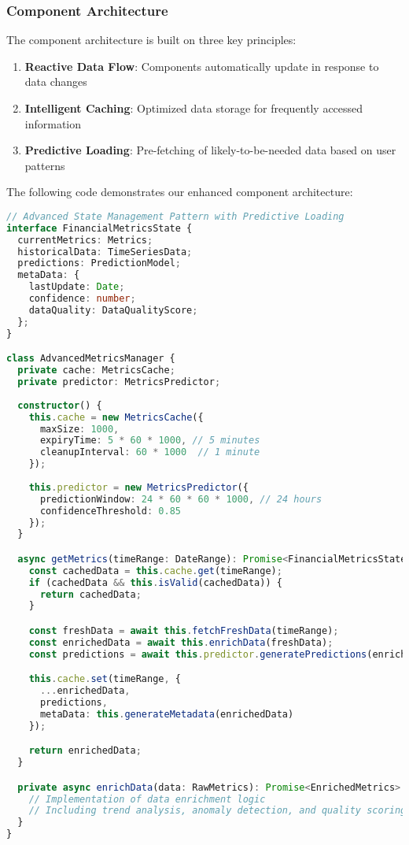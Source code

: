 \documentclass[conference]{IEEEtran}
\begin{document}
\subsubsection{Component Architecture}
The component architecture is built on three key principles:
\begin{enumerate}
\item \textbf{Reactive Data Flow}: Components automatically update in response to data changes
\item \textbf{Intelligent Caching}: Optimized data storage for frequently accessed information
\item \textbf{Predictive Loading}: Pre-fetching of likely-to-be-needed data based on user patterns
\end{enumerate}

The following code demonstrates our enhanced component architecture:

\begin{lstlisting}[language=TypeScript, caption=Enhanced Component Architecture Implementation]
// Advanced State Management Pattern with Predictive Loading
interface FinancialMetricsState {
  currentMetrics: Metrics;
  historicalData: TimeSeriesData;
  predictions: PredictionModel;
  metaData: {
    lastUpdate: Date;
    confidence: number;
    dataQuality: DataQualityScore;
  };
}

class AdvancedMetricsManager {
  private cache: MetricsCache;
  private predictor: MetricsPredictor;
  
  constructor() {
    this.cache = new MetricsCache({
      maxSize: 1000,
      expiryTime: 5 * 60 * 1000, // 5 minutes
      cleanupInterval: 60 * 1000  // 1 minute
    });
    
    this.predictor = new MetricsPredictor({
      predictionWindow: 24 * 60 * 60 * 1000, // 24 hours
      confidenceThreshold: 0.85
    });
  }

  async getMetrics(timeRange: DateRange): Promise<FinancialMetricsState> {
    const cachedData = this.cache.get(timeRange);
    if (cachedData && this.isValid(cachedData)) {
      return cachedData;
    }

    const freshData = await this.fetchFreshData(timeRange);
    const enrichedData = await this.enrichData(freshData);
    const predictions = await this.predictor.generatePredictions(enrichedData);

    this.cache.set(timeRange, {
      ...enrichedData,
      predictions,
      metaData: this.generateMetadata(enrichedData)
    });

    return enrichedData;
  }

  private async enrichData(data: RawMetrics): Promise<EnrichedMetrics> {
    // Implementation of data enrichment logic
    // Including trend analysis, anomaly detection, and quality scoring
  }
}
\end{lstlisting}
\end{document}
